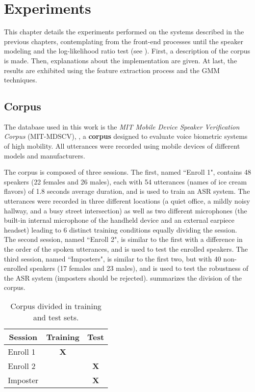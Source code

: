 \chapter{Experiments}
\label{ch:experiments}

This chapter details the experiments performed on the systems described in the previous chapters, contemplating from the front-end processes until the speaker modeling and the log-likelihood ratio test (see ). First, a description of the corpus is made. Then, explanations about the implementation are given. At last, the results are exhibited using the feature extraction process and the GMM techniques.

\section{Corpus}
\label{sec:corpus}

The database used in this work is the \emph{MIT Mobile Device Speaker Verification Corpus} (MIT-MDSCV), , a \textbf{corpus} designed to evaluate voice biometric systems of high mobility. All utterances were recorded using mobile devices of different models and manufacturers.

The corpus is composed of three sessions. The first, named ``Enroll 1", contains 48 speakers (22 females and 26 males), each with 54 utterances (names of ice cream flavors) of 1.8 seconds average duration, and is used to train an ASR system. The utterances were recorded in three different locations (a quiet office, a mildly noisy hallway, and a busy street intersection) as well as two different microphones (the built-in internal microphone of the handheld device and an external earpiece headset) leading to 6 distinct training conditions equally dividing the session. The second session, named ``Enroll 2", is similar to the first with a difference in the order of the spoken utterances, and is used to test the enrolled speakers. The third session, named ``Imposters", is similar to the first two, but with 40 non-enrolled speakers (17 females and 23 males), and is used to test the robustness of the ASR system (imposters should be rejected).  summarizes the division of the corpus.

\begin{table}[h]
    \small
    \centering
    \begin{tabular}{|l|c|c|}
    \hline
    \multicolumn{1}{|c|}{{\bf Session}} & {\bf Training} & {\bf Test} \\ \hline
    Enroll 1                            & {\bf X}        & {\bf }     \\ \hline
    Enroll 2                            & {\bf }         & {\bf X}    \\ \hline
    Imposter                            & {\bf }         & {\bf X}    \\ \hline
    \end{tabular}
    \caption{Corpus divided in training and test sets.}
    \label{tab:corpus-division}
\end{table}

